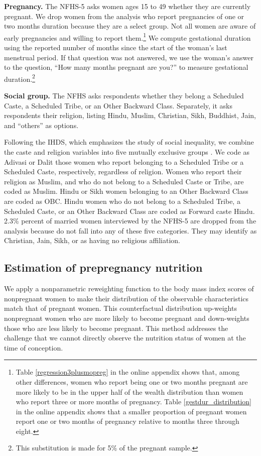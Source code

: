\documentclass[12pt]{article}
\begin{document}
{\bf{Pregnancy.}}  The NFHS-5 asks women ages 15 to 49 whether they are currently pregnant.  We drop women from the analysis who report pregnancies of one or two months duration because they are a select group.  Not all women are aware of early pregnancies and willing to report them.\footnote{Table \ref{regression3plusmopreg} in the online appendix shows that, among other differences, women who report being one or two months pregnant are more likely to be in the upper half of the wealth distribution than women who report three or more months of pregnancy. Table \ref{gestdur_distribution} in the online appendix shows that a smaller proportion of pregnant women report one or two months of pregnancy relative to months three through eight.}  We compute gestational duration using the reported number of months since the start of the woman's last menstrual period.  If that question was not answered, we use the woman's answer to the question, ``How many months pregnant are you?'' to measure gestational duration.\footnote{This substitution is made for 5\% of the pregnant sample.}  

{\bf{Social group.}} The NFHS asks respondents whether they belong a Scheduled Caste, a Scheduled Tribe, or an Other Backward Class.  Separately, it asks respondents their religion, listing Hindu, Muslim, Christian, Sikh, Buddhist, Jain, and ``others'' as options. 

Following the IHDS, which emphasizes the study of social inequality, we combine the caste and religion variables into five mutually exclusive groups \citep{IHDS2005}.  We code as Adivasi or Dalit those women who report belonging to a Scheduled Tribe or a Scheduled Caste, respectively, regardless of religion.  Women who report their religion as Muslim, and who do not belong to a Scheduled Caste or Tribe, are coded as Muslim. Hindu or Sikh women belonging to an Other Backward Class are coded as OBC.  Hindu women who do not belong to a Scheduled Tribe, a Scheduled Caste, or an Other Backward Class are coded as Forward caste Hindu.  2.3\% percent of married women interviewed by the NFHS-5 are dropped from the analysis because do not fall into any of these five categories.  They may identify as Christian, Jain, Sikh, or as having no religious affiliation.   

\subsection{Estimation of prepregnancy nutrition}

We apply a nonparametric reweighting function to the body mass index scores of nonpregnant women to make their distribution of the observable characteristics match that of pregnant women. This counterfactual distribution up-weights nonpregnant women who are more likely to become pregnant and down-weights those who are less likely to become pregnant. This method addresses the challenge that we cannot directly observe the nutrition status of women at the time of conception. 
 
\end{document}
